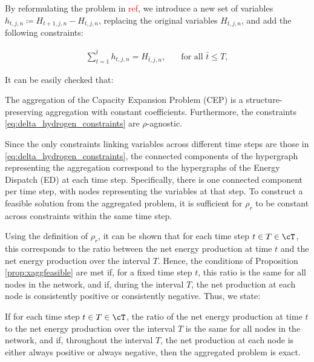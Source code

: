 {{\color{violet}
By reformulating the problem in \textcolor{red}{ref}, we introduce a new set of variables \(h_{t,j,n} \coloneqq H_{t+1,j,n} - H_{t,j,n}\), replacing the original variables \(H_{t,j,n}\), and add the following constraints:

\begin{align}
  \sum_{t=1}^{\bar{t}} h_{t,j,n} = H_{\bar{t},j,n}, & \quad \text{for all } \bar{t} \leq T, \label{eq:delta_hydrogen_constraints}
\end{align}

It can be easily checked that:

\begin{observation}
  The aggregation of the Capacity Expansion Problem (CEP) is a structure-preserving aggregation with constant coefficients. Furthermore, the constraints \eqref{eq:delta_hydrogen_constraints} are \(\rho\)-agnostic.
\end{observation}

Since the only constraints linking variables across different time steps are those in \eqref{eq:delta_hydrogen_constraints}, the connected components of the hypergraph representing the aggregation correspond to the hypergraphs of the Energy Dispatch (ED) at each time step. Specifically, there is one connected component per time step, with nodes representing the variables at that step. To construct a feasible solution from the aggregated problem, it is sufficient for \(\rho_r\) to be constant across constraints within the same time step.

Using the definition of \(\rho_r\), it can be shown that for each time step \(t \in T \in \cT\), this corresponds to the ratio between the net energy production at time \(t\) and the net energy production over the interval \(T\). Hence, the conditions of Proposition \ref{prop:xaggfeasible} are met if, for a fixed time step \(t\), this ratio is the same for all nodes in the network, and if, during the interval \(T\), the net production at each node is consistently positive or consistently negative. Thus, we state:

\begin{observation}
  \label{obs:cep_agg_feasible}
  If for each time step \(t \in T \in \cT\), the ratio of the net energy production at time \(t\) to the net energy production over the interval \(T\) is the same for all nodes in the network, and if, throughout the interval \(T\), the net production at each node is either always positive or always negative, then the aggregated problem is exact.
\end{observation}

}}

